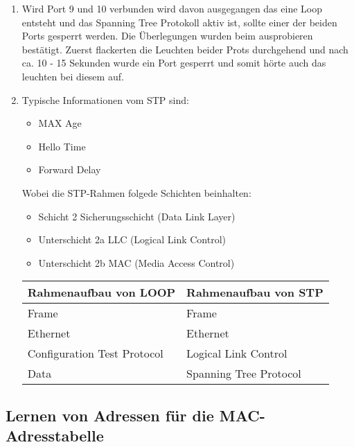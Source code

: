\documentclass{scrartcl}
\begin{document}
\begin{enumerate}
    \item
    Wird Port 9 und 10 verbunden wird davon ausgegangen das eine Loop entsteht und das Spanning Tree Protokoll aktiv ist, sollte einer der beiden Ports gesperrt werden. Die Überlegungen wurden beim ausprobieren bestätigt.
    Zuerst flackerten die Leuchten beider Prots durchgehend und nach ca. 10 - 15 Sekunden wurde ein Port gesperrt und somit hörte auch das leuchten bei diesem auf.
   
   \newpage
    \item
    Typische Informationen vom STP sind:
   
    \begin{itemize}
      \item MAX Age
      \item Hello Time
      \item Forward Delay
    \end{itemize}
    
     Wobei die STP-Rahmen folgede Schichten beinhalten: 
     
     \begin{itemize}
     \item Schicht 2 Sicherungsschicht (Data Link Layer)
     \item Unterschicht 2a LLC (Logical Link Control)
     \item Unterschicht 2b MAC (Media Access Control)
     \end{itemize}
  
  \begin{table}[htbp]
  \begin{tabular}{|l|l}
      \textbf{Rahmenaufbau von LOOP} & \textbf{Rahmenaufbau von STP} \\ \hline
		 Frame     & Frame \\
		 Ethernet    & Ethernet \\
		 Configuration Test Protocol & Logical Link Control \\
		 Data & Spanning Tree Protocol\\
    \end{tabular}
    \end{table}
       \end{enumerate}
       
   \subsection[Aufgabe 6 Lernen von Adressen für die MAC-Adresstabelle]{Lernen von Adressen für die MAC-Adresstabelle}
   
\end{document}
